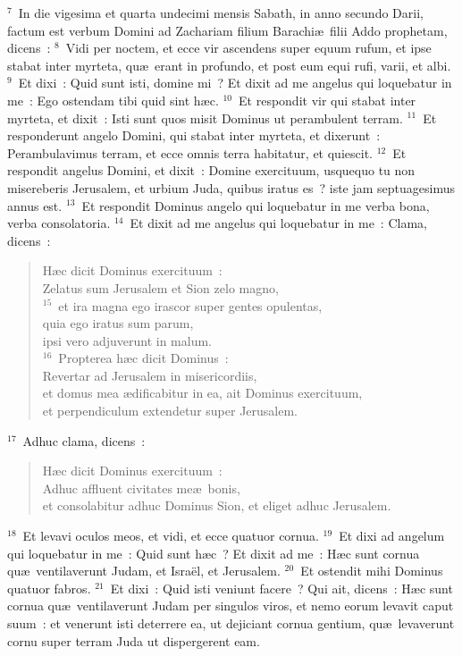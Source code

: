 ${}^{7}$~In die vigesima et quarta undecimi mensis Sabath, in anno secundo Darii, factum est verbum Domini ad Zachariam filium Barachi\ae\ filii Addo prophetam, dicens~:
${}^{8}$~Vidi per noctem, et ecce vir ascendens super equum rufum, et ipse stabat inter myrteta, qu\ae\ erant in profundo, et post eum equi rufi, varii, et albi.
${}^{9}$~Et dixi~: Quid sunt isti, domine mi~? Et dixit ad me angelus qui loquebatur in me~: Ego ostendam tibi quid sint h\ae c.
${}^{10}$~Et respondit vir qui stabat inter myrteta, et dixit~: Isti sunt quos misit Dominus ut perambulent terram.
${}^{11}$~Et responderunt angelo Domini, qui stabat inter myrteta, et dixerunt~: Perambulavimus terram, et ecce omnis terra habitatur, et quiescit.
${}^{12}$~Et respondit angelus Domini, et dixit~: Domine exercituum, usquequo tu non misereberis Jerusalem, et urbium Juda, quibus iratus es~? iste jam septuagesimus annus est.
${}^{13}$~Et respondit Dominus angelo qui loquebatur in me verba bona, verba consolatoria.
${}^{14}$~Et dixit ad me angelus qui loquebatur in me~: Clama, dicens~: \begin{verse}H\ae c dicit Dominus exercituum~:\\ Zelatus sum Jerusalem et Sion zelo magno,\\
${}^{15}$~et ira magna ego irascor super gentes opulentas,\\ quia ego iratus sum parum,\\ ipsi vero adjuverunt in malum.\\
${}^{16}$~Propterea h\ae c dicit Dominus~:\\ Revertar ad Jerusalem in misericordiis,\\ et domus mea \ae dificabitur in ea, ait Dominus exercituum,\\ et perpendiculum extendetur super Jerusalem.\end{verse}


${}^{17}$~Adhuc clama, dicens~: \begin{verse}H\ae c dicit Dominus exercituum~:\\ Adhuc affluent civitates me\ae\ bonis,\\ et consolabitur adhuc Dominus Sion, et eliget adhuc Jerusalem.\end{verse}


${}^{18}$~Et levavi oculos meos, et vidi, et ecce quatuor cornua.
${}^{19}$~Et dixi ad angelum qui loquebatur in me~: Quid sunt h\ae c~? Et dixit ad me~: H\ae c sunt cornua qu\ae\ ventilaverunt Judam, et Isra\"el, et Jerusalem.
${}^{20}$~Et ostendit mihi Dominus quatuor fabros.
${}^{21}$~Et dixi~: Quid isti veniunt facere~? Qui ait, dicens~: H\ae c sunt cornua qu\ae\ ventilaverunt Judam per singulos viros, et nemo eorum levavit caput suum~: et venerunt isti deterrere ea, ut dejiciant cornua gentium, qu\ae\ levaverunt cornu super terram Juda ut dispergerent eam.

